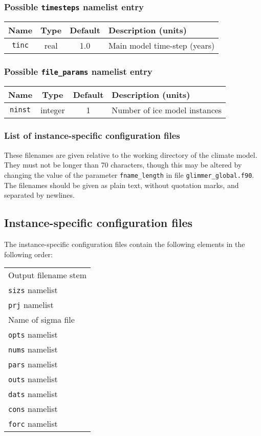 \subsubsection {Possible \texttt{timesteps} namelist entry}
%
\begin{center}
\begin{tabular}{|c|c|c|l|}
\hline
Name & Type & Default & Description (units) \\
\hline
\hline
\texttt{tinc} & real & 1.0 & Main model time-step (years) \\
\hline
\end{tabular}
\end{center}
%
\subsubsection{Possible \texttt{file\_params} namelist entry}
\begin{center}
\begin{tabular}{|c|c|c|l|}
\hline
Name & Type & Default & Description (units) \\
\hline
\hline
\texttt{ninst} & integer & 1 & Number of ice model instances \\
\hline 
\end{tabular}
\end{center}
%
\subsubsection{List of instance-specific configuration files}
%
These filenames are given relative to the working directory of the climate
model. They must not be longer than 70 characters, though this may be altered
by changing the value of the parameter \texttt{fname\_length} in file
\texttt{glimmer\_global.f90}. The filenames should be given as plain text,
without quotation marks, and separated by newlines. 
%
\subsection{Instance-specific configuration files}
%
The instance-specific configuration files contain the following elements in
the following order:
\begin{center}
\begin{tabular}{l}
Output filename stem \\
\texttt{sizs} namelist \\
\texttt{prj} namelist \\
Name of sigma file \\
\texttt{opts} namelist \\
\texttt{nums} namelist \\
\texttt{pars} namelist \\
\texttt{outs} namelist \\
\texttt{dats} namelist \\
\texttt{cons} namelist \\
\texttt{forc} namelist \\
\end{tabular}
\end{center}
%
